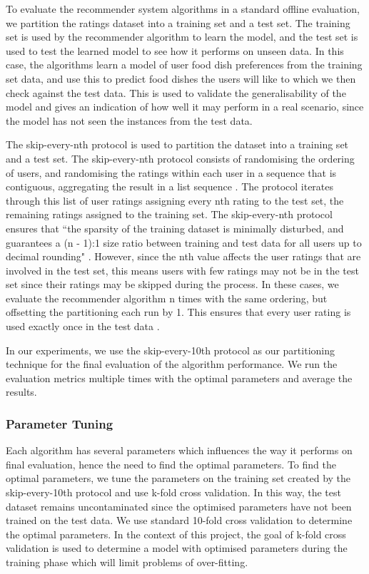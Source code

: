 To evaluate the recommender system algorithms in a standard offline evaluation, we partition the ratings dataset into a training set and a test set. The training set is used by the recommender algorithm to learn the model, and the test set is used to test the learned model to see how it performs on unseen data. In this case, the algorithms learn a model of user food dish preferences from the training set data, and use this to predict food dishes the users will like to which we then check against the test data. This is used to validate the generalisability of the model and gives an indication of how well it may perform in a real scenario, since the model has not seen the instances from the test data.

The skip-every-nth protocol \cite{zhang} is used to partition the dataset into a training set and a test set. The skip-every-nth protocol consists of randomising the ordering of users, and randomising the ratings within each user in a sequence that is contiguous, aggregating the result in a list sequence \cite{zhang}. The protocol iterates through this list of user ratings assigning every nth rating to the test set, the remaining ratings assigned to the training set. The skip-every-nth protocol ensures that ``the sparsity of the training dataset is minimally disturbed, and guarantees a (n - 1):1 size ratio between training and test data for all users up to decimal rounding" \cite{zhang}. However, since the nth value affects the user ratings that are involved in the test set, this means users with few ratings may not be in the test set since their ratings may be skipped during the process. 
 In these cases, we evaluate the recommender algorithm n times with the same ordering, but offsetting the partitioning each run by 1. This ensures that every user rating is used exactly once in the test data \cite{zhang}. 

In our experiments, we use the skip-every-10th protocol as our partitioning technique for the final evaluation of the algorithm performance. We run the evaluation metrics multiple times with the optimal parameters and average the results. 

\subsubsection{Parameter Tuning}

Each algorithm has several parameters which influences the way it performs on final evaluation, hence the need to find the optimal parameters. To find the optimal parameters, we tune the parameters on the training set created by the skip-every-10th protocol and use k-fold cross validation. In this way, the test dataset remains uncontaminated since the optimised parameters have not been trained on the test data. 
We use standard 10-fold cross validation to determine the optimal parameters. In the context of this project, the goal of k-fold cross validation is used to determine a model with optimised parameters during the training phase which will limit problems of over-fitting. 


